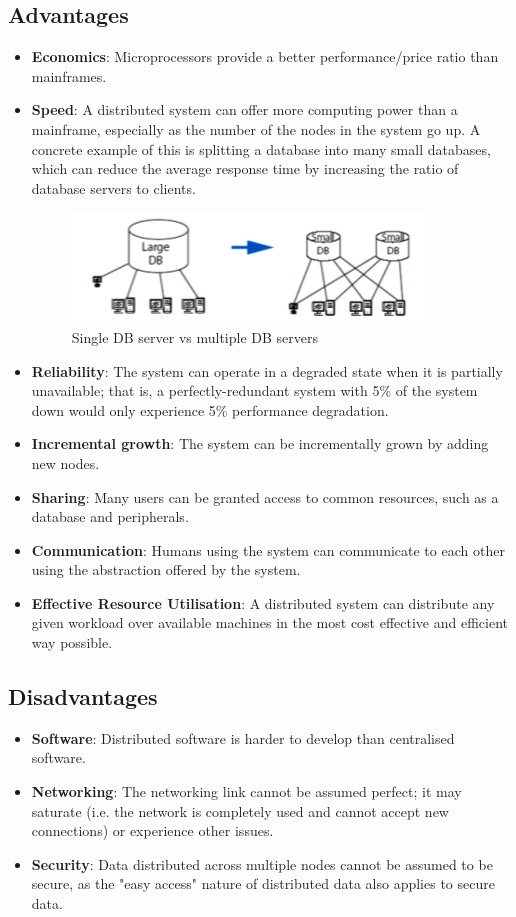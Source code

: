 \subsection{Advantages}
\begin{itemize}
\item \textbf{Economics}: Microprocessors provide a better performance/price ratio than mainframes.
\item \textbf{Speed}: A distributed system can offer more computing power than a mainframe, especially as the number of the nodes in the system go up. A concrete example of this is splitting a database into many small databases, which can reduce the average response time by increasing the ratio of database servers to clients.\begin{figure}[h]
\centering
\includegraphics[width=0.5\linewidth]{screenshot008}
\caption{Single DB server vs multiple DB servers}
\label{fig:screenshot008}
\end{figure}
\item \textbf{Reliability}: The system can operate in a degraded state when it is partially unavailable; that is, a perfectly-redundant system with 5\% of the system down would only experience 5\% performance degradation.
\item \textbf{Incremental growth}: The system can be incrementally grown by adding new nodes.
\item \textbf{Sharing}: Many users can be granted access to common resources, such as a database and peripherals.
\item \textbf{Communication}: Humans using the system can communicate to each other using the abstraction offered by the system.
\item \textbf{Effective Resource Utilisation}: A distributed system can distribute any given workload over available machines in the most cost effective and efficient way possible.
\end{itemize}

\subsection{Disadvantages}
\begin{itemize}
\item \textbf{Software}: Distributed software is harder to develop than centralised software.
\item \textbf{Networking}: The networking link cannot be assumed perfect; it may saturate (i.e. the network is completely used and cannot accept new connections) or experience other issues.
\item \textbf{Security}: Data distributed across multiple nodes cannot be assumed to be secure, as the "easy access" nature of distributed data also applies to secure data.
\end{itemize}



